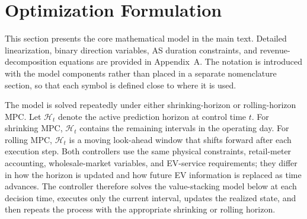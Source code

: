 \documentclass[final,5p,times]{elsarticle}
\newcommand{\calH}{\mathcal{H}}
\begin{document}
\section{Optimization Formulation}
This section presents the core mathematical model in the main text. Detailed linearization, binary direction variables, AS duration constraints, and revenue-decomposition equations are provided in Appendix~A. The notation is introduced with the model components rather than placed in a separate nomenclature section, so that each symbol is defined close to where it is used.

The model is solved repeatedly under either shrinking-horizon or rolling-horizon MPC. Let $\calH_t$ denote the active prediction horizon at control time $t$. For shrinking MPC, $\calH_t$ contains the remaining intervals in the operating day. For rolling MPC, $\calH_t$ is a moving look-ahead window that shifts forward after each execution step. Both controllers use the same physical constraints, retail-meter accounting, wholesale-market variables, and EV-service requirements; they differ in how the horizon is updated and how future EV information is replaced as time advances. The controller therefore solves the value-stacking model below at each decision time, executes only the current interval, updates the realized state, and then repeats the process with the appropriate shrinking or rolling horizon.
\end{document}
